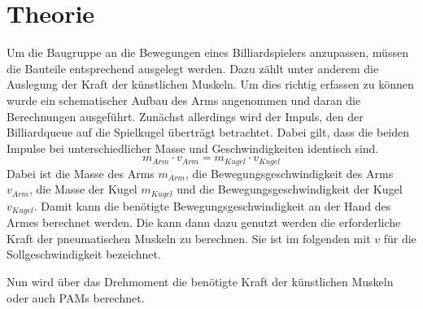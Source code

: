 \chapter{Theorie}
Um die Baugruppe an die Bewegungen eines Billiardspielers anzupassen, müssen die Bauteile entsprechend ausgelegt werden. 
Dazu zählt unter anderem die Auslegung der Kraft der künstlichen Muskeln. 
Um dies richtig erfassen zu können wurde ein schematischer Aufbau des Arms angenommen und daran die Berechnungen ausgeführt. 
Zunächst allerdings wird der Impuls, den der Billiardqueue auf die Spielkugel überträgt betrachtet. 
Dabei gilt, dass die beiden Impulse bei unterschiedlicher Masse und Geschwindigkeiten identisch sind. 
\begin{equation}
	m_{Arm} \cdot v_{Arm} = m_{Kugel} \cdot v_{Kugel}
	\label{eq:ImpulsKugel}
\end{equation}
Dabei ist die Masse des Arms \(m_{Arm}\), die Bewegungsgeschwindigkeit des Arms \(v_{Arm}\), die Masse der Kugel \(m_{Kugel}\) und die Bewegungsgeschwindigkeit der Kugel \(v_{Kugel}\).
Damit kann die benötigte Bewegungsgeschwindigkeit an der Hand des Armes berechnet werden.
Die kann dann dazu genutzt werden die erforderliche Kraft der pneumatischen Muskeln zu berechnen.
Sie ist im folgenden mit \(v\) für die Sollgeschwindigkeit bezeichnet. \par
Nun wird über das Drehmoment die benötigte Kraft der künstlichen Muskeln oder auch PAMs berechnet. 



